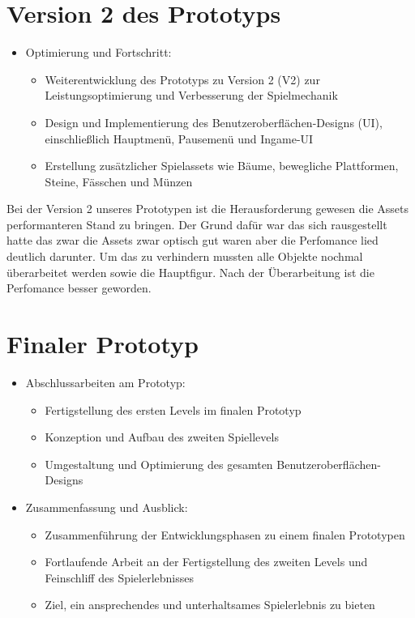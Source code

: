 \pagebreak

\section{Version 2 des Prototyps}

\begin{itemize}
  \item Optimierung und Fortschritt:
    \begin{itemize}
      \item Weiterentwicklung des Prototyps zu Version 2 (V2) zur Leistungsoptimierung und Verbesserung der Spielmechanik
      \item Design und Implementierung des Benutzeroberflächen-Designs (UI), einschließlich Hauptmenü, Pausemenü und Ingame-UI
      \item Erstellung zusätzlicher Spielassets wie Bäume, bewegliche Plattformen, Steine, Fässchen und Münzen
    \end{itemize}
\end{itemize}

Bei der Version 2 unseres Prototypen ist die Herausforderung gewesen die Assets performanteren Stand zu bringen. Der Grund dafür war das sich rausgestellt hatte das zwar die Assets zwar optisch gut waren aber die Perfomance lied deutlich darunter. Um das zu verhindern mussten alle Objekte nochmal überarbeitet werden sowie die Hauptfigur. Nach der Überarbeitung ist die Perfomance besser geworden.

\pagebreak

\section{Finaler Prototyp}

\begin{itemize}
  \item Abschlussarbeiten am Prototyp:
    \begin{itemize}
      \item Fertigstellung des ersten Levels im finalen Prototyp
      \item Konzeption und Aufbau des zweiten Spiellevels
      \item Umgestaltung und Optimierung des gesamten Benutzeroberflächen-Designs
    \end{itemize}
    
  \item Zusammenfassung und Ausblick:
    \begin{itemize}
      \item Zusammenführung der Entwicklungsphasen zu einem finalen Prototypen
      \item Fortlaufende Arbeit an der Fertigstellung des zweiten Levels und Feinschliff des Spielerlebnisses
      \item Ziel, ein ansprechendes und unterhaltsames Spielerlebnis zu bieten
    \end{itemize}
\end{itemize}



\pagebreak

